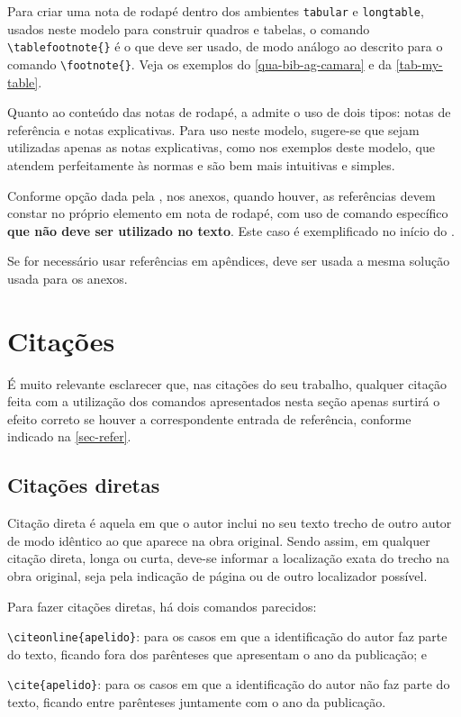 Para criar uma nota de rodapé dentro dos ambientes \verb|tabular| e \verb|longtable|, usados neste modelo para construir quadros e tabelas, o comando \verb|\tablefootnote{}| é o que deve ser usado, de modo análogo ao descrito para o comando \verb|\footnote{}|. Veja os exemplos do \autoref{qua-bib-ag-camara} e da \autoref{tab-my-table}.

Quanto ao conteúdo das notas de rodapé, a  admite o uso de dois tipos: notas de referência e notas explicativas. Para uso neste modelo, sugere-se que sejam utilizadas apenas as notas explicativas, como nos exemplos deste modelo, que atendem perfeitamente às normas e são bem mais intuitivas e simples.

Conforme opção dada pela , nos anexos, quando houver, as referências devem constar no próprio elemento em nota de rodapé, com uso de comando específico \textbf{que não deve ser utilizado no texto}. Este caso é exemplificado no início do .

Se for necessário usar referências em apêndices, deve ser usada a mesma solução usada para os anexos.

\section{Citações}\label{sec-citacao}

É muito relevante esclarecer que, nas citações do seu trabalho, qualquer citação feita com a utilização dos comandos apresentados nesta seção apenas surtirá o efeito correto se houver a correspondente entrada de referência, conforme indicado na \autoref{sec-refer}.

\subsection{Citações diretas}
Citação direta é aquela em que o autor inclui no seu texto trecho de outro autor de modo idêntico ao que aparece na obra original. Sendo assim, em qualquer citação direta, longa ou curta, deve-se informar a localização exata do trecho na obra original, seja pela indicação de página ou de outro localizador possível.

Para fazer citações diretas, há dois comandos parecidos:

\begin{alineas}
    \item \verb|\citeonline{apelido}|: para os casos em que a identificação do autor faz parte do texto, ficando fora dos parênteses que apresentam o ano da publicação; e
    \item \verb|\cite{apelido}|: para os casos em que a identificação do autor não faz parte do texto, ficando entre parênteses juntamente com o ano da publicação.
\end{alineas}

